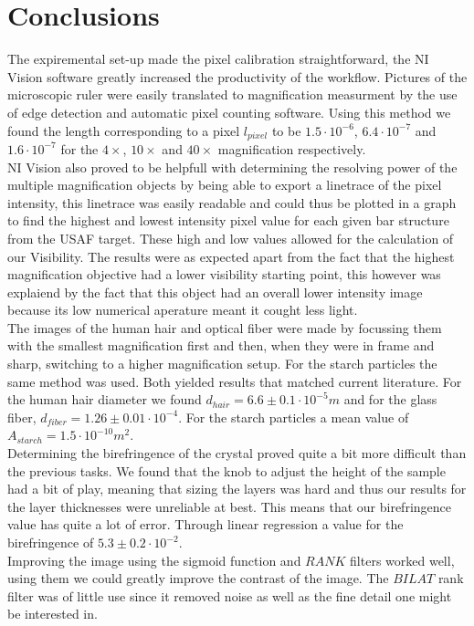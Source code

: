 \section{Conclusions}

The expiremental set-up made the pixel calibration straightforward, the NI Vision software greatly increased the productivity of the workflow. Pictures of the microscopic ruler were easily translated to magnification measurment by the use of edge detection and automatic pixel counting software. Using this method we found the length corresponding to a pixel $l_{pixel}$ to be $1.5\cdot10^{-6}$, $6.4\cdot10^{-7}$ and $1.6\cdot10^{-7}$ for the $4\times$, $10\times$ and $40\times$ magnification respectively.\\
NI Vision also proved to be helpfull with determining the resolving power of the multiple magni\-fication objects by being able to export a linetrace of the pixel intensity, this linetrace was easily readable and could thus be plotted in a graph to find the highest and lowest intensity pixel value for each given bar structure from the USAF target. These high and low values allowed for the calculation of our Visibility. The results were as expected apart from the fact that the highest magnification objective had a lower visibility starting point, this however was explaiend by the fact that this object had an overall lower intensity image because its low numerical aperature meant it cought less light.\\
The images of the human hair and optical fiber were made by focussing them with the smallest magnification first and then, when they were in frame and sharp, switching to a higher magnification setup. For the starch particles the same method was used. Both yielded results that matched current literature. For the human hair diameter we found $d_{hair}=6.6\pm0.1\cdot10^{-5} m$ and for the glass fiber, $d_{fiber} = 1.26\pm0.01\cdot10^{-4}$. For the starch particles a mean value of $A_{starch}=1.5\cdot10^{-10} m^2$.\\
Determining the birefringence of the crystal proved quite a bit more difficult than the previous tasks. We found that the knob to adjust the height of the sample had a bit of play, meaning that sizing the layers was hard and thus our results for the layer thicknesses were unreliable at best. This means that our birefringence value has quite a lot of error. Through linear regression a value for the birefringence of $5.3\pm0.2\cdot10^{-2}$.\\
Improving the image using the sigmoid function and $RANK$ filters worked well, using them we could greatly improve the contrast of the image. The $BILAT$ rank filter was of little use since it removed noise as well as the fine detail one might be interested in.\\

